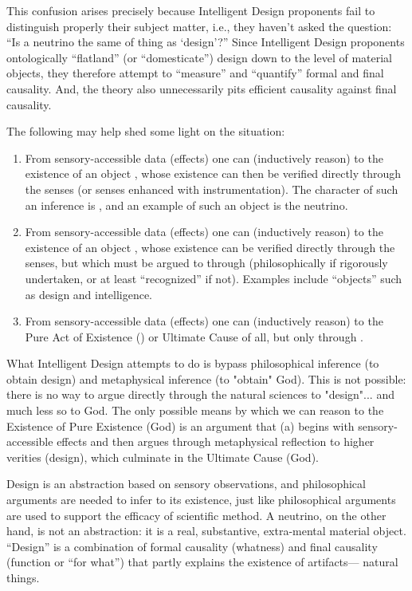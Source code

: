 This confusion arises precisely because Intelligent Design proponents fail to distinguish properly their subject matter, i.e., they haven't asked the question: ``Is a neutrino the same  of thing as `design'?'' Since Intelligent Design proponents ontologically ``flatland'' (or ``domesticate'') design down to the level of material objects, they therefore attempt to ``measure'' and ``quantify'' formal and final causality. And, the theory also unnecessarily pits efficient causality against final causality.

The following may help shed some light on the situation:
\begin{enumerate}
\item From sensory-accessible data (effects) one can  (inductively reason) to the existence of an object , whose existence can then be verified directly through the senses (or senses enhanced with instrumentation). The character of such an inference is , and an example of such an object is the neutrino.
\item From sensory-accessible data (effects) one can  (inductively reason) to the existence of an object , whose existence can  be verified directly through the senses, but which must be argued to through  (philosophically if rigorously undertaken, or at least ``recognized'' if not). Examples include ``objects'' such as design and intelligence.
\item From sensory-accessible data (effects) one can  (inductively reason) to the Pure Act of Existence () or Ultimate Cause of all, but only through .
\end{enumerate}

What Intelligent Design attempts to do is bypass philosophical inference (to obtain design) and metaphysical inference (to "obtain" God). This is not possible: there is no way to argue directly through the natural sciences to "design"... and much less so to God. The only possible means by which we can reason to the Existence of Pure Existence (God) is an argument that (a) begins with sensory-accessible effects and then argues through metaphysical reflection to higher verities (design), which culminate in the Ultimate Cause (God).

Design is an abstraction based on sensory observations, and philosophical arguments are needed to infer to its existence, just like philosophical arguments are used to support the efficacy of scientific method. A neutrino, on the other hand, is not an abstraction: it is a real, substantive, extra-mental material object. ``Design'' is a combination of formal causality (whatness) and final causality (function or ``for what'') that partly explains the existence of artifacts--- natural things.

